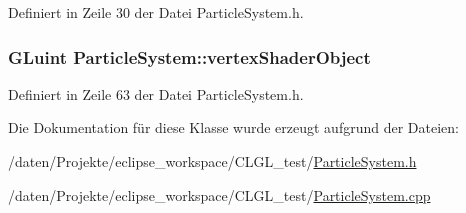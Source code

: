 Definiert in Zeile 30 der Datei Particle\-System.\-h.

\hypertarget{classParticleSystem_ac269ed2dcffba188047f99bab97a70cf}{
\subsubsection[{vertex\-Shader\-Object}]{\setlength{\rightskip}{0pt plus 5cm}G\-Luint Particle\-System\-::vertex\-Shader\-Object\hspace{0.3cm}{\ttfamily [private]}}}\label{classParticleSystem_ac269ed2dcffba188047f99bab97a70cf}


Definiert in Zeile 63 der Datei Particle\-System.\-h.



Die Dokumentation für diese Klasse wurde erzeugt aufgrund der Dateien\-:\begin{DoxyCompactItemize}
\item 
/daten/\-Projekte/eclipse\-\_\-workspace/\-C\-L\-G\-L\-\_\-test/\hyperlink{CLGL__test_2ParticleSystem_8h}{Particle\-System.\-h}\item 
/daten/\-Projekte/eclipse\-\_\-workspace/\-C\-L\-G\-L\-\_\-test/\hyperlink{CLGL__test_2ParticleSystem_8cpp}{Particle\-System.\-cpp}\end{DoxyCompactItemize}
